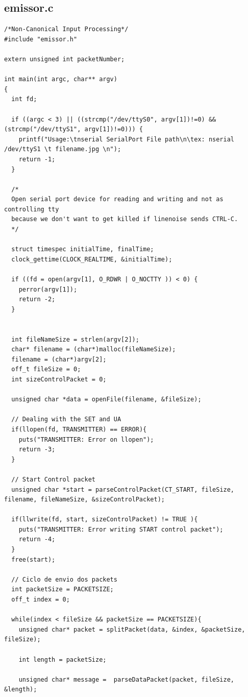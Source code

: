 \documentclass{article}
\begin{document}
\subsection{emissor.c}

\begin{lstlisting}[style=CStyle]
/*Non-Canonical Input Processing*/
#include "emissor.h"

extern unsigned int packetNumber;

int main(int argc, char** argv)
{
  int fd;

  if ((argc < 3) || ((strcmp("/dev/ttyS0", argv[1])!=0) && (strcmp("/dev/ttyS1", argv[1])!=0))) {
    printf("Usage:\tnserial SerialPort File path\n\tex: nserial /dev/ttyS1 \t filename.jpg \n");
    return -1;
  }

  /*
  Open serial port device for reading and writing and not as controlling tty
  because we don't want to get killed if linenoise sends CTRL-C.
  */
  
  struct timespec initialTime, finalTime;
  clock_gettime(CLOCK_REALTIME, &initialTime);

  if ((fd = open(argv[1], O_RDWR | O_NOCTTY )) < 0) {
    perror(argv[1]);
    return -2;
  }


  int fileNameSize = strlen(argv[2]);
  char* filename = (char*)malloc(fileNameSize);
  filename = (char*)argv[2];
  off_t fileSize = 0;
  int sizeControlPacket = 0;

  unsigned char *data = openFile(filename, &fileSize);

  // Dealing with the SET and UA
  if(llopen(fd, TRANSMITTER) == ERROR){
    puts("TRANSMITTER: Error on llopen");
    return -3;
  }

  // Start Control packet
  unsigned char *start = parseControlPacket(CT_START, fileSize, filename, fileNameSize, &sizeControlPacket);

  if(llwrite(fd, start, sizeControlPacket) != TRUE ){
    puts("TRANSMITTER: Error writing START control packet");
    return -4;
  }
  free(start);

  // Ciclo de envio dos packets
  int packetSize = PACKETSIZE;
  off_t index = 0;

  while(index < fileSize && packetSize == PACKETSIZE){
    unsigned char* packet = splitPacket(data, &index, &packetSize, fileSize);

    int length = packetSize;
    
    unsigned char* message =  parseDataPacket(packet, fileSize, &length);


\end{lstlisting}
\end{document}
